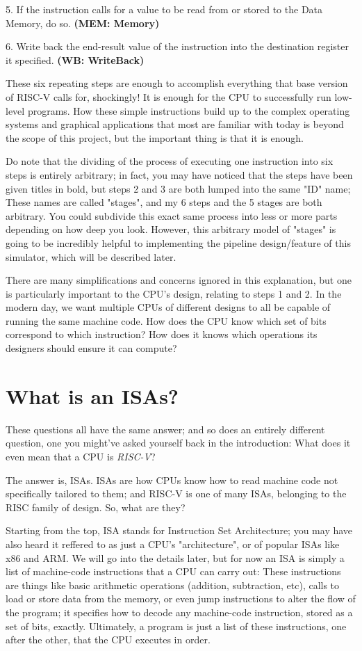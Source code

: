 \documentclass[12pt,twoside]{reedthesis}
\begin{document}
5. If the instruction calls for a value to be read from or stored to the Data Memory, do so. \textbf{(MEM: Memory)}

6. Write back the end-result value of the instruction into the destination register it specified. \textbf{(WB: WriteBack)}

These six repeating steps are enough to accomplish everything that base version of RISC-V calls for, shockingly! It is enough for the CPU to successfully run low-level programs. How these simple instructions build up to the complex operating systems and graphical applications that most are familiar with today is beyond the scope of this project, but the important thing is that it is enough.

Do note that the dividing of the process of executing one instruction into six steps is entirely arbitrary; in fact, you may have noticed that the steps have been given titles in bold, but steps 2 and 3 are both lumped into the same "ID" name; These names are called "stages", and my 6 steps and the 5 stages are both arbitrary. You could subdivide this exact same process into less or more parts depending on how deep you look. However, this arbitrary model of "stages" is going to be incredibly helpful to implementing the pipeline design/feature of this simulator, which will be described later.

There are many simplifications and concerns ignored in this explanation, but one is particularly important to the CPU's design, relating to steps 1 and 2. In the modern day, we want multiple CPUs of different designs to all be capable of running the same machine code. How does the CPU know which set of bits correspond to which instruction? How does it knows which operations its designers should ensure it can compute?

\section{What is an ISAs?}

These questions all have the same answer; and so does an entirely different question, one you might've asked yourself back in the introduction: What does it even mean that a CPU is \textit{RISC-V}?

The answer is, ISAs. ISAs are how CPUs know how to read machine code not specifically tailored to them; and RISC-V is one of many ISAs, belonging to the RISC family of design. So, what are they?

Starting from the top, ISA stands for Instruction Set Architecture; you may have also heard it reffered to as just a CPU's "architecture", or of popular ISAs like x86 and ARM. We will go into the details later, but for now an ISA is simply a list of machine-code instructions that a CPU can carry out: These instructions are things like basic arithmetic operations (addition, subtraction, etc), calls to load or store data from the memory, or even jump instructions to alter the flow of the program; it specifies how to decode any machine-code instruction, stored as a set of bits, exactly. Ultimately, a program is just a list of these instructions, one after the other, that the CPU executes in order.
\end{document}
